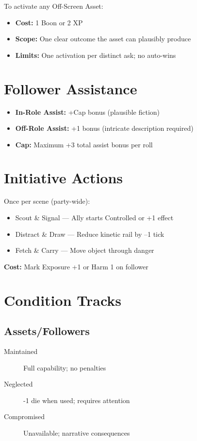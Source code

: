 To activate any Off-Screen Asset:
\begin{itemize}
  \item \textbf{Cost:} 1 Boon or 2 XP
  \item \textbf{Scope:} One clear outcome the asset can plausibly produce
  \item \textbf{Limits:} One activation per distinct ask; no auto-wins
\end{itemize}

\section{Follower Assistance}

\begin{itemize}
  \item \textbf{In-Role Assist:} +Cap bonus (plausible fiction)
  \item \textbf{Off-Role Assist:} +1 bonus (intricate description required)
  \item \textbf{Cap:} Maximum +3 total assist bonus per roll
\end{itemize}

\section{Initiative Actions}

Once per scene (party-wide):
\begin{itemize}
  \item Scout \& Signal — Ally starts Controlled or +1 effect
  \item Distract \& Draw — Reduce kinetic rail by –1 tick
  \item Fetch \& Carry — Move object through danger
\end{itemize}
\textbf{Cost:} Mark Exposure +1 or Harm 1 on follower

\section{Condition Tracks}

\subsection*{Assets/Followers}
\begin{description}
  \item[Maintained] Full capability; no penalties
  \item[Neglected] -1 die when used; requires attention
  \item[Compromised] Unavailable; narrative consequences
\end{description}

